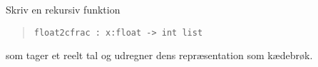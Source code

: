 Skriv en rekursiv funktion
  \begin{quote}
    \lstinline{float2cfrac : x:float -> int list}
  \end{quote}
  som tager et reelt tal og udregner dens repræsentation som kædebrøk.
